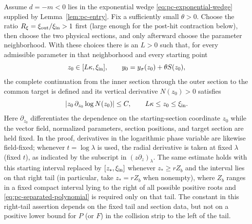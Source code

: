 \begin{lemma}
\label{lem:pc-normal-derivative}
Assume $d=-m<0$ lies in the exponential wedge
\eqref{eq:pc-exponential-wedge} supplied by Lemma~\ref{lem:pc-entry}.
Fix a sufficiently small $\theta>0$.  Choose the ratio
\(R_\xi=\xi_{\rm out}/\xi_{\rm in}>1\) first (large enough for the
post-hit contraction below), then choose the two physical sections, and
only afterward choose the parameter neighborhood.  With these choices
there is an $L>0$ such that, for every admissible parameter in that
neighborhood and every starting point
\[
 z_0\in[L\kappa,\xi_{\rm in}],\qquad
 y_0=y_\sigma(z_0)+\theta S(z_0),
\]
the complete continuation from the inner section through the outer
section to the common target is defined and its vertical derivative
\(N(z_0)>0\) satisfies
\begin{equation}
\label{eq:pc-normal-bound}
 |z_0\,\partial_{z_0}\log N(z_0)|\le C,
 \qquad L\kappa\le z_0\le\xi_{\rm in}.
\end{equation}
Here $\partial_{z_0}$ differentiates the dependence on the
starting-section coordinate $z_0$ while the vector field, normalized
parameters, section positions, and target section are held fixed.  In
the proof, derivatives in the logarithmic phase variable are likewise
field-fixed; whenever $t=\log\lambda$ is used, the radial derivative is
taken at fixed $\lambda$ (fixed $t$), as indicated by the subscript in
$(z\partial_z)_\lambda$.  The same estimate holds with this starting
interval replaced by $[z_*,\xi_{\rm in}]$ whenever $z_*\ge rZ_b$ and
the interval lies on that right tail (in particular, take
$z_*=rZ_b$ when nonempty), where $Z_b$ ranges in a fixed compact
interval lying to the right of all possible positive roots and
\eqref{eq:pc-separated-polynomial} is required only on that tail.  The
constant in this right-tail assertion depends on the fixed tail and
section data, but not on a positive lower bound for $P$ (or $F$) in the
collision strip to the left of the tail.
\end{lemma}

